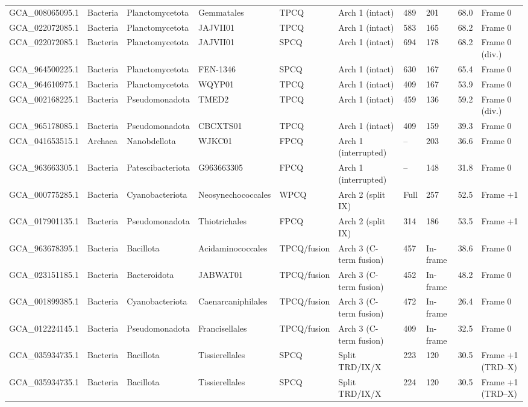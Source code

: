 \documentclass[10pt,letterpaper]{article}
\begin{document}
{\begin{longtable}{@{}llllllllll@{}}
GCA\_008065095.1 & Bacteria & Planctomycetota & Gemmatales & TPCQ & Arch 1 (intact) & 489 & 201 & 68.0 & Frame 0 \\
GCA\_022072085.1 & Bacteria & Planctomycetota & JAJVII01 & TPCQ & Arch 1 (intact) & 583 & 165 & 68.2 & Frame 0 \\
GCA\_022072085.1 & Bacteria & Planctomycetota & JAJVII01 & SPCQ & Arch 1 (intact) & 694 & 178 & 68.2 & Frame 0 (div.) \\
GCA\_964500225.1 & Bacteria & Planctomycetota & FEN-1346 & SPCQ & Arch 1 (intact) & 630 & 167 & 65.4 & Frame 0 \\
GCA\_964610975.1 & Bacteria & Planctomycetota & WQYP01 & TPCQ & Arch 1 (intact) & 409 & 167 & 53.9 & Frame 0 \\
GCA\_002168225.1 & Bacteria & Pseudomonadota & TMED2 & TPCQ & Arch 1 (intact) & 459 & 136 & 59.2 & Frame 0 (div.) \\
GCA\_965178085.1 & Bacteria & Pseudomonadota & CBCXTS01 & TPCQ & Arch 1 (intact) & 409 & 159 & 39.3 & Frame 0 \\
GCA\_041653515.1 & Archaea & Nanobdellota & WJKC01 & FPCQ & Arch 1 (interrupted) & -- & 203 & 36.6 & Frame 0 \\
GCA\_963663305.1 & Bacteria & Patescibacteriota & G963663305 & FPCQ & Arch 1 (interrupted) & -- & 148 & 31.8 & Frame 0 \\
GCA\_000775285.1 & Bacteria & Cyanobacteriota & Neosynechococcales & WPCQ & Arch 2 (split IX) & Full & 257 & 52.5 & Frame +1 \\
GCA\_017901135.1 & Bacteria & Pseudomonadota & Thiotrichales & FPCQ & Arch 2 (split IX) & 314 & 186 & 53.5 & Frame +1 \\
GCA\_963678395.1 & Bacteria & Bacillota & Acidaminococcales & TPCQ/fusion & Arch 3 (C-term fusion) & 457 & In-frame & 38.6 & Frame 0 \\
GCA\_023151185.1 & Bacteria & Bacteroidota & JABWAT01 & TPCQ/fusion & Arch 3 (C-term fusion) & 452 & In-frame & 48.2 & Frame 0 \\
GCA\_001899385.1 & Bacteria & Cyanobacteriota & Caenarcaniphilales & TPCQ/fusion & Arch 3 (C-term fusion) & 472 & In-frame & 26.4 & Frame 0 \\
GCA\_012224145.1 & Bacteria & Pseudomonadota & Francisellales & TPCQ/fusion & Arch 3 (C-term fusion) & 409 & In-frame & 32.5 & Frame 0 \\
GCA\_035934735.1 & Bacteria & Bacillota & Tissierellales & SPCQ & Split TRD/IX/X & 223 & 120 & 30.5 & Frame +1 (TRD--X) \\
GCA\_035934735.1 & Bacteria & Bacillota & Tissierellales & SPCQ & Split TRD/IX/X & 224 & 120 & 30.5 & Frame +1 (TRD--X) \\
\end{longtable}
}
\end{document}
